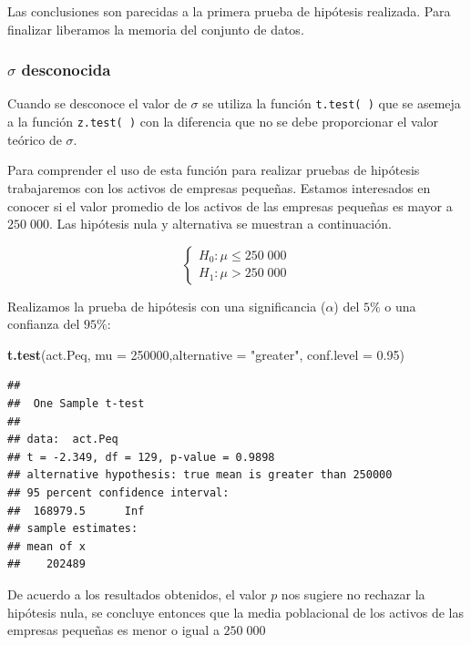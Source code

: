 \documentclass[letterpaper,]{book}
\newenvironment{Shaded}{\begin{snugshade}}{\end{snugshade}}
\newcommand{\DataTypeTok}[1]{\textcolor[rgb]{0.13,0.29,0.53}{#1}}
\newcommand{\DecValTok}[1]{\textcolor[rgb]{0.00,0.00,0.81}{#1}}
\newcommand{\FloatTok}[1]{\textcolor[rgb]{0.00,0.00,0.81}{#1}}
\newcommand{\KeywordTok}[1]{\textcolor[rgb]{0.13,0.29,0.53}{\textbf{#1}}}
\newcommand{\NormalTok}[1]{#1}
\newcommand{\StringTok}[1]{\textcolor[rgb]{0.31,0.60,0.02}{#1}}
\begin{document}
Las conclusiones son parecidas a la primera prueba de hipótesis realizada. Para finalizar liberamos la memoria del conjunto de datos.

\hypertarget{sigma-desconocida}{%
\subsubsection{\texorpdfstring{\(\sigma\) desconocida}{\textbackslash{}sigma desconocida}}\label{sigma-desconocida}}

Cuando se desconoce el valor de \(\sigma\) se utiliza la función \texttt{t.test(\ )} que se asemeja a la función \texttt{z.test(\ )} con la diferencia que no se debe proporcionar el valor teórico de \(\sigma\).

Para comprender el uso de esta función para realizar pruebas de hipótesis trabajaremos con los activos de empresas pequeñas. Estamos interesados en conocer si el valor promedio de los activos de las empresas pequeñas es mayor a \(250\;000\). Las hipótesis nula y alternativa se muestran a continuación.

\begin{equation} 
\begin{cases} 
H_0: \mu \leq 250\;000 \\ 
H_1: \mu > 250\;000
\end{cases} 
\end{equation}

Realizamos la prueba de hipótesis con una significancia (\(\alpha\)) del \(5\%\) o una confianza del \(95\%\):

\begin{Shaded}
\begin{Highlighting}[]
\KeywordTok{t.test}\NormalTok{(act.Peq, }\DataTypeTok{mu =} \DecValTok{250000}\NormalTok{,}\DataTypeTok{alternative =} \StringTok{"greater"}\NormalTok{,  }\DataTypeTok{conf.level =} \FloatTok{0.95}\NormalTok{)}
\end{Highlighting}
\end{Shaded}

\begin{verbatim}
## 
##  One Sample t-test
## 
## data:  act.Peq
## t = -2.349, df = 129, p-value = 0.9898
## alternative hypothesis: true mean is greater than 250000
## 95 percent confidence interval:
##  168979.5      Inf
## sample estimates:
## mean of x 
##    202489
\end{verbatim}

De acuerdo a los resultados obtenidos, el valor \(p\) nos sugiere no rechazar la hipótesis nula, se concluye entonces que la media poblacional de los activos de las empresas pequeñas es menor o igual a \(250\;000\)
\end{document}
